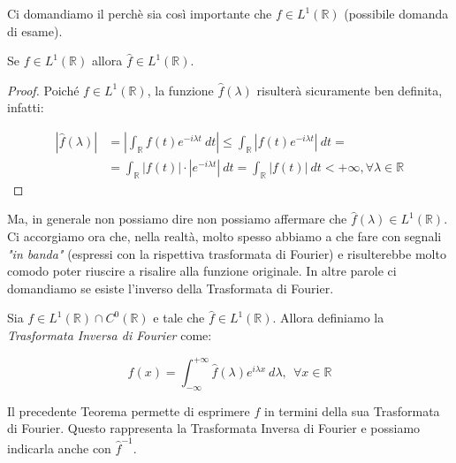 Ci domandiamo il perchè sia così importante che $f \in L^1(\mathbb{R})$
(possibile domanda di esame).\\

\begin{center}
    Se $f \in L^1(\mathbb{R})$ allora $\hat{f} \in L^1(\mathbb{R})$.
\end{center}

\begin{proof}
    Poiché $f \in L^1(\mathbb{R})$, la funzione $\hat{f}(\lambda)$ risulterà
    sicuramente ben definita, infatti:

    \begin{equation}
        \begin{aligned}
            |\hat{f}(\lambda)| & = \left|\int_{\mathbb{R}} f(t) e^{-i \lambda t} \ dt \right| \leq \int_{\mathbb{R}} |f(t) e^{-i \lambda t}| \ dt =                  \\
                               & = \int_{\mathbb{R}} |f(t)| \cdot |e^{-i \lambda t}| \ dt = \int_{\mathbb{R}} |f(t)| \ dt < + \infty, \forall \lambda \in \mathbb{R}
        \end{aligned}
    \end{equation}

\end{proof}

Ma, in generale non possiamo dire non possiamo affermare che $\hat{f}(\lambda)
    \in L^1(\mathbb{R})$.\\


Ci accorgiamo ora che, nella realtà, molto spesso abbiamo a che fare con segnali
\textit{"in banda"} (espressi con la rispettiva trasformata di Fourier) e
risulterebbe molto comodo poter riuscire a risalire alla funzione originale. In
altre parole ci domandiamo se esiste l'inverso della Trasformata di Fourier.

\begin{theorem}
    Sia $f \in L^1(\mathbb{R}) \cap C^0(\mathbb{R})$ e tale che $\hat{f} \in
        L^1(\mathbb{R})$. Allora definiamo la \textit{Trasformata Inversa di
        Fourier} come:

    $$
        f(x) = \int_{-\infty}^{+\infty} \hat{f}(\lambda) e^{i \lambda x} \ d\lambda, \ \ \forall x \in \mathbb{R}
    $$
\end{theorem}

Il precedente Teorema permette di esprimere $f$ in termini della sua Trasformata
di Fourier. Questo rappresenta la Trasformata Inversa di Fourier e possiamo
indicarla anche con $\hat{f}^{-1}$.

